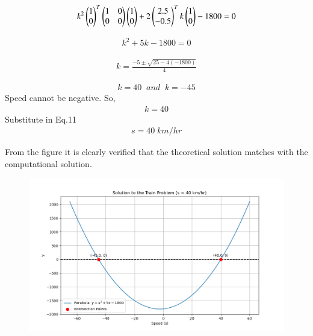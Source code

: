 \documentclass[journal]{IEEEtran}
\theoremstyle{remark}
\begin{document}
\begin{align}
k^2\begin{pmatrix}1\\0\end{pmatrix}^T\begin{pmatrix}1&0\\0&0\end{pmatrix}\begin{pmatrix}1\\0\end{pmatrix}+2\begin{pmatrix}2.5\\-0.5\end{pmatrix}^Tk\begin{pmatrix}1\\0\end{pmatrix}-1800=0
\end{align}

\begin{align}
  k^2+5k-1800=0
\end{align}

\begin{align}
   k=\frac{-5\pm \sqrt{25-4(-1800)}}{4}
\end{align}

\begin{align}
    k=40\;\;and \;\;k=-45
\end{align}
Speed cannot be negative. So,
\begin{align}
    k=40
\end{align}
Substitute in Eq.11
\begin{align}
   s=40\;km/hr
\end{align}



From the figure it is clearly verified that the theoretical solution matches with the computational solution.\\
\begin{figure}[h]
    \centering
    \includegraphics[height=0.5\textheight, keepaspectratio]{figs/figure1.png}
    \label{figure_1}
\end{figure}
\end{document}
